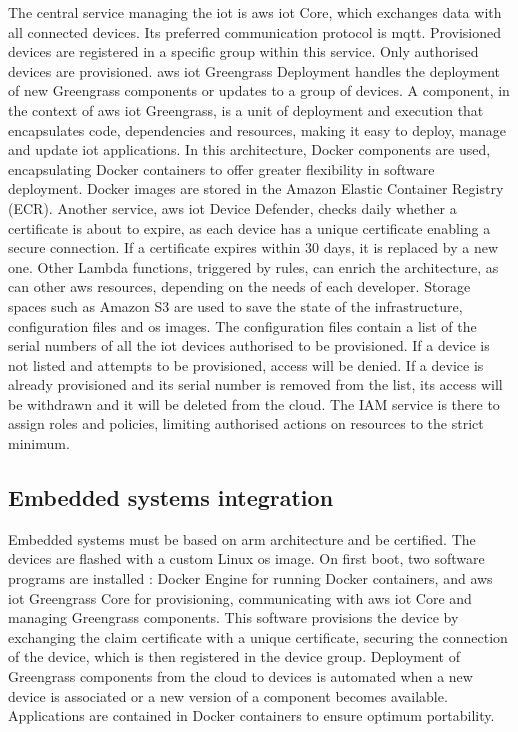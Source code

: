 The central service managing the \acrshort{iot} is \gls{aws} \acrshort{iot} Core, which exchanges data with all connected devices. Its preferred communication protocol is \acrshort{mqtt}. Provisioned devices are registered in a specific group within this service. Only authorised devices are provisioned. \gls{aws} \acrshort{iot} Greengrass Deployment handles the deployment of new Greengrass components or updates to a group of devices. A component, in the context of \gls{aws} \acrshort{iot} Greengrass, is a unit of deployment and execution that encapsulates code, dependencies and resources, making it easy to deploy, manage and update \acrshort{iot} applications. In this architecture, Docker components are used, encapsulating Docker containers to offer greater flexibility in software deployment. Docker images are stored in the Amazon Elastic Container Registry (ECR). Another service, \gls{aws} \acrshort{iot} Device Defender, checks daily whether a certificate is about to expire, as each device has a unique certificate enabling a secure connection. If a certificate expires within 30 days, it is replaced by a new one. Other Lambda functions, triggered by rules, can enrich the architecture, as can other \gls{aws} resources, depending on the needs of each developer. Storage spaces such as Amazon S3 are used to save the state of the infrastructure, configuration files and \acrshort{os} images. The configuration files contain a list of the serial numbers of all the \acrshort{iot} devices authorised to be provisioned. If a device is not listed and attempts to be provisioned, access will be denied. If a device is already provisioned and its serial number is removed from the list, its access will be withdrawn and it will be deleted from the \gls{cloud}. The IAM service is there to assign roles and policies, limiting authorised actions on resources to the strict minimum.

\subsection{Embedded systems integration}
Embedded systems must be based on \gls{arm} architecture and be  certified. The devices are flashed with a custom Linux \acrshort{os} image. On first boot, two software programs are installed : Docker Engine for running Docker containers, and \gls{aws} \acrshort{iot} Greengrass Core for \gls{provisioning}, communicating with \gls{aws} \acrshort{iot} Core and managing Greengrass components. This software provisions the device by exchanging the claim certificate with a unique certificate, securing the connection of the device, which is then registered in the device group. Deployment of Greengrass components from the \gls{cloud} to devices is automated when a new device is associated or a new version of a component becomes available. Applications are contained in Docker containers to ensure optimum portability.


